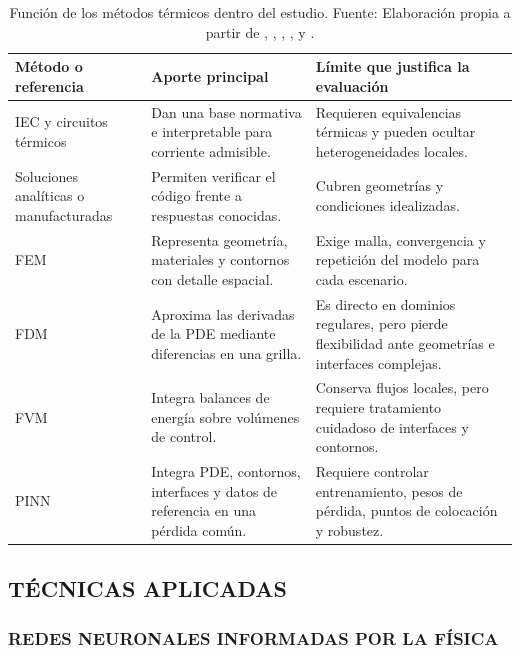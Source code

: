 \begin{table}[htbp]
\centering
\caption{Función de los métodos térmicos dentro del estudio. Fuente: Elaboración propia a partir de \textcite{iec60287}, \textcite{iec60853}, \textcite[4--6]{enescu2021}, \textcite[3--4,93--99]{cigre2025}, \textcite{patankar1980numerical} y \textcite{raissi2019}.}
\label{tab:metodos-calculo-termico}
\begingroup
\footnotesize
\setlength{\tabcolsep}{3pt}
\renewcommand{\arraystretch}{1.25}
\begin{tabularx}{\textwidth}{L{3.1cm}Y Y}
\toprule
\textbf{Método o referencia} & \textbf{Aporte principal} & \textbf{Límite que justifica la evaluación} \\
\midrule
IEC y circuitos térmicos & Dan una base normativa e interpretable para corriente admisible. & Requieren equivalencias térmicas y pueden ocultar heterogeneidades locales. \\
Soluciones analíticas o manufacturadas & Permiten verificar el código frente a respuestas conocidas. & Cubren geometrías y condiciones idealizadas. \\
FEM & Representa geometría, materiales y contornos con detalle espacial. & Exige malla, convergencia y repetición del modelo para cada escenario. \\
FDM & Aproxima las derivadas de la PDE mediante diferencias en una grilla. & Es directo en dominios regulares, pero pierde flexibilidad ante geometrías e interfaces complejas. \\
FVM & Integra balances de energía sobre volúmenes de control. & Conserva flujos locales, pero requiere tratamiento cuidadoso de interfaces y contornos. \\
PINN & Integra PDE, contornos, interfaces y datos de referencia en una pérdida común. & Requiere controlar entrenamiento, pesos de pérdida, puntos de colocación y robustez. \\
\bottomrule
\end{tabularx}
\endgroup
\end{table}

\subsection{TÉCNICAS APLICADAS}
\label{sec:tecnicas-aplicadas}

\subsubsection{REDES NEURONALES INFORMADAS POR LA FÍSICA}
\label{subsec:pinn}


